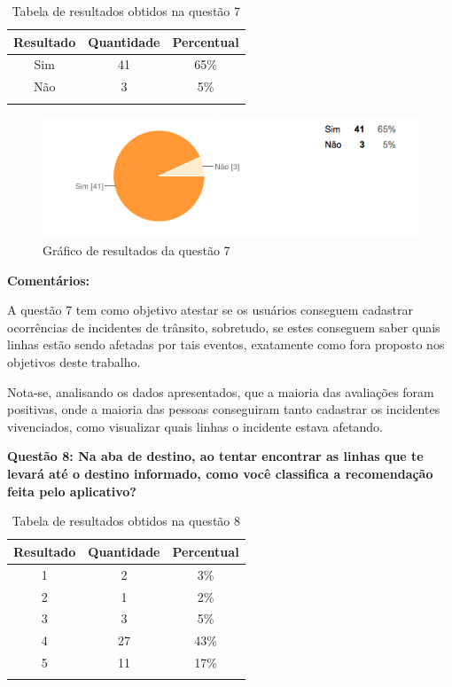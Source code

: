 \begin{center}
\begin{longtable}{c|c|c}
\hline
    \multicolumn{1}{c}{\textbf{Resultado}} & \multicolumn{1}{c}{\textbf{Quantidade}} & \multicolumn{1}{c}{\textbf{Percentual}} \\
\hline
    Sim & 41 &  65\%\\
    \hline
    Não & 3 & 5\%\\
    \hline
\caption{Tabela de resultados obtidos na questão 7}
\label{tabq7}
\end{longtable}
\end{center}


\begin{figure}[h]
\begin{center}
  \includegraphics[width=16cm]{images/graficos/questao7.png}
  \caption{Gráfico de resultados da questão 7}
  \label{fig:questao7}
\end{center}
\end{figure}

\textbf{Comentários:}

A questão 7 tem como objetivo atestar se os usuários conseguem cadastrar ocorrências de incidentes de trânsito, sobretudo, se estes conseguem saber quais linhas estão sendo afetadas por tais eventos, exatamente como fora proposto nos objetivos deste trabalho.
	
Nota-se, analisando os dados apresentados, que a maioria das avaliações foram positivas, onde a maioria das pessoas conseguiram tanto cadastrar os incidentes vivenciados, como visualizar quais linhas o incidente estava afetando. \newline

\textbf{Questão 8: Na aba de destino, ao tentar encontrar as linhas que te levará até o destino informado, como você classifica a recomendação feita pelo aplicativo? }

\begin{center}
\begin{longtable}{c|c|c}
\hline
    \multicolumn{1}{c}{\textbf{Resultado}} & \multicolumn{1}{c}{\textbf{Quantidade}} & \multicolumn{1}{c}{\textbf{Percentual}} \\
\hline
    1 & 2 &  3\%\\
    \hline
    2 & 1 & 2\%\\
    \hline
    3 & 3 &  5\%\\
    \hline
    4 & 27 & 43\%\\
    \hline
    5 & 11 & 17\%\\
    \hline
\caption{Tabela de resultados obtidos na questão 8}
\label{tabq8}
\end{longtable}
\end{center}


